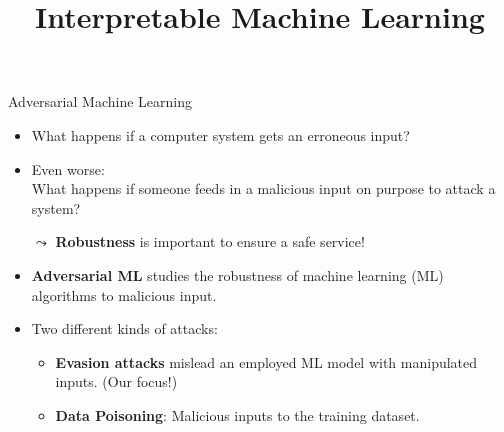 \documentclass[11pt,compress,t,notes=noshow, aspectratio=169, xcolor=table]{beamer}
\title{Interpretable Machine Learning}
\date{}
\begin{document}
\newcommand{\vertiii}[1]{{\left\vert\kern-0.25ex\left\vert\kern-0.25ex\left\vert #1 
    \right\vert\kern-0.25ex\right\vert\kern-0.25ex\right\vert}}


 \newcommand{\titlefigure}{figure/AEturtle.jpg}
\newcommand{\learninggoals}{
\item Understand the definition of AEs and their relation to Counterfactual Explanations
\item Understand different methods that generate AEs
\item Discuss potential causes of AEs and standard defenses against them}



\begin{frame}[c]{Adversarial Machine Learning}
\begin{itemize}
    \item What happens if a computer system gets an erroneous input?
    \item Even worse:\\ What happens if someone feeds in a malicious input on purpose to attack a system?
    \item[$\leadsto$] \textbf{Robustness} is important to ensure a safe service!
    \medskip
    \item \textbf{Adversarial ML} studies the robustness of machine learning (ML) algorithms to malicious input.
    \item Two different kinds of attacks:
    \begin{itemize}
        \item \textbf{Evasion attacks} mislead an employed ML model with manipulated inputs. (Our focus!)
        \item \textbf{Data Poisoning}: Malicious inputs to the training dataset.
    \end{itemize}
    \end{itemize}
\end{frame}
\end{document}
